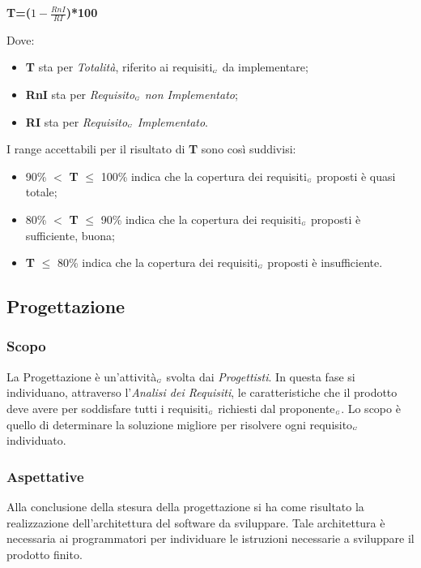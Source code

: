 \begin{center}
	\textbf{T=($1-\frac{RnI}{RI}$)*100}
\end{center}
Dove:
\begin{itemize}
	\item \textbf{T} sta per \textit{Totalità}, riferito ai requisiti$_{\scaleto{G}{3pt}}$ da implementare;
	\item \textbf{RnI} sta per \textit{Requisito$_{\scaleto{G}{3pt}}$ non Implementato};
	\item \textbf{RI} sta per \textit{Requisito$_{\scaleto{G}{3pt}}$ Implementato}.
\end{itemize}
I range accettabili per il risultato di \textbf{T} sono così suddivisi:
\begin{itemize}
	\item 90\% $<$ \textbf{T} $\leq$ 100\% indica che la copertura dei requisiti$_{\scaleto{G}{3pt}}$ proposti è quasi totale;
	\item 80\% $<$ \textbf{T} $\leq$ 90\% indica che la copertura dei requisiti$_{\scaleto{G}{3pt}}$ proposti è sufficiente, buona;
	\item \textbf{T} $\leq$ 80\% indica che la copertura dei requisiti$_{\scaleto{G}{3pt}}$ proposti è insufficiente.
\end{itemize}


\subsection{Progettazione}\label{ProcessiPrimariProgettazione}
\subsubsection{Scopo}\label{ProcessiPrimariProgettazioneScopo}
La Progettazione è un'attività$_{\scaleto{G}{3pt}}$ svolta dai \textit{Progettisti}. In questa fase si individuano, attraverso l'\textit{Analisi dei Requisiti}, le caratteristiche che il prodotto deve avere per soddisfare tutti i requisiti$_{\scaleto{G}{3pt}}$ richiesti dal proponente$_{\scaleto{G}{3pt}}$. Lo scopo è quello di determinare la soluzione migliore per risolvere ogni requisito$_{\scaleto{G}{3pt}}$ individuato. 
\subsubsection{Aspettative}\label{ProcessiPrimariProgettazioneAspettative}
Alla conclusione della stesura della progettazione si ha come risultato la realizzazione dell'architettura del software da sviluppare. Tale architettura è necessaria ai programmatori per individuare le istruzioni necessarie a sviluppare il prodotto finito.
